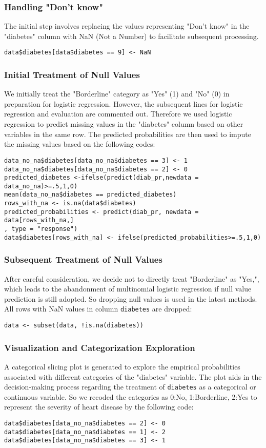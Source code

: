 \documentclass{article}
\begin{document}
\subsubsection*{Handling "Don't know"}
The initial step involves replacing the values representing "Don't know" in the "diabetes" column with NaN (Not a Number) to facilitate subsequent processing.
\begin{verbatim}
data$diabetes[data$diabetes == 9] <- NaN
\end{verbatim}
\subsubsection*{Initial Treatment of Null Values }
We initially treat the "Borderline" category as "Yes" (1) and "No" (0) in preparation for logistic regression. However, the subsequent lines for logistic regression and evaluation are commented out. Therefore we used logistic regression to predict missing values in the "diabetes" column based on other variables in the same row. The predicted probabilities are then used to impute the missing values based on the following codes:
\begin{verbatim}
data_no_na$diabetes[data_no_na$diabetes == 3] <- 1 
data_no_na$diabetes[data_no_na$diabetes == 2] <- 0 
predicted_diabetes <-ifelse(predict(diab_pr,newdata = data_no_na)>=.5,1,0)
mean(data_no_na$diabetes == predicted_diabetes)
rows_with_na <- is.na(data$diabetes)
predicted_probabilities <- predict(diab_pr, newdata = data[rows_with_na,]
, type = "response")
data$diabetes[rows_with_na] <- ifelse(predicted_probabilities>=.5,1,0)
\end{verbatim}
\subsubsection*{Subsequent Treatment of Null Values}
After careful consideration, we decide not to directly treat "Borderline" as "Yes,", which leads to the abandonment of multinomial logistic regression if null value prediction is still adopted. So dropping null values is used in the latest methods. All rows with NaN values in column \verb|diabetes| are dropped:
\begin{verbatim}
data <- subset(data, !is.na(diabetes))
\end{verbatim}
\subsubsection*{Visualization and Categorization Exploration}
A categorical slicing plot is generated to explore the empirical probabilities associated with different categories of the "diabetes" variable. The plot aids in the decision-making process regarding the treatment of  \verb|diabetes| as a categorical or continuous variable. So we recoded the categories as 0:No, 1:Borderline, 2:Yes to represent the severity of heart disease by the following code:
\begin{verbatim}
data$diabetes[data_no_na$diabetes == 2] <- 0 
data$diabetes[data_no_na$diabetes == 1] <- 2
data$diabetes[data_no_na$diabetes == 3] <- 1
\end{verbatim}
\end{document}
